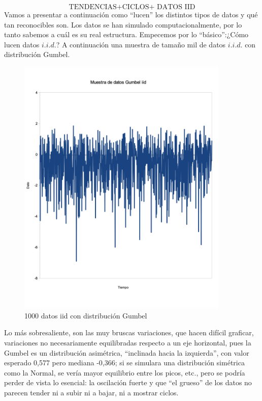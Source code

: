 \documentclass[
  oneside]{book}
\begin{document}
\[
\text{TENDENCIAS+CICLOS+ DATOS IID}
\] Vamos a presentar a continuación como ``lucen'' los distintos tipos
de datos y qué tan reconocibles son. Los datos se han simulado
computacionalmente, por lo tanto sabemos a cuál es su real estructura.
Empecemos por lo ``básico'':¿Cómo lucen datos \(i.i.d.\)? A continuación
una muestra de tamaño mil de datos \(i.i.d.\) con distribución Gumbel.

\begin{figure}
\centering
\includegraphics[width=0.9\textwidth,height=\textheight]{images/p1.png}
\caption{1000 datos iid con distribución Gumbel}
\end{figure}

Lo más sobresaliente, son las muy bruscas variaciones, que hacen difícil
graficar, variaciones no necesariamente equilibradas respecto a un eje
horizontal, pues la Gumbel es un distribución asimétrica, ``inclinada
hacia la izquierda'', con valor esperado 0,577 pero mediana -0,366; si
se simulara una distribución simétrica como la Normal, se vería mayor
equilibrio entre los picos, etc., pero se podría perder de vista lo
esencial: la oscilación fuerte y que ``el grueso'' de los datos no
parecen tender ni a subir ni a bajar, ni a mostrar ciclos.
\end{document}
